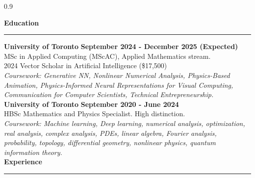 \documentclass{article}
\begin{document}

\begin{spacing}{0.9}

\LARGE{\textbf{Education}}\\
\vspace{-0.2cm}
\noindent\rule{18.25cm}{0.7pt}
\large{\textbf{University of Toronto}} \hspace{\fill} \small\textbf{September 2024 - December 2025 (Expected)}\\
\small MSc in Applied Computing (MScAC), Applied Mathematics stream.\\
\small 2024 Vector Scholar in Artificial Intelligence (\$17,500)\\
\scriptsize\emph{Coursework: Generative NN, Nonlinear Numerical Analysis, Physics-Based Animation, Physics-Informed Neural Representations for Visual Computing, Communication for Computer Scientists, Technical Entrepreneurship.}\\[0.20cm]


\large{\textbf{University of Toronto}} \hspace{\fill} \small\textbf{September 2020 - June 2024}\\
\small HBSc Mathematics and Physics Specialist. High distinction.\\
\scriptsize\emph{Coursework: Machine learning, Deep learning, numerical analysis, optimization, real analysis, complex analysis, PDEs, linear algebra, Fourier analysis, probability, topology, differential geometry, nonlinear physics, quantum information theory.}\\[0.20cm]

\LARGE{\textbf{Experience}}\normalsize\\
\vspace{-0.2cm}
\noindent\rule{18.25cm}{0.7pt}





\end{spacing}
\end{document}
